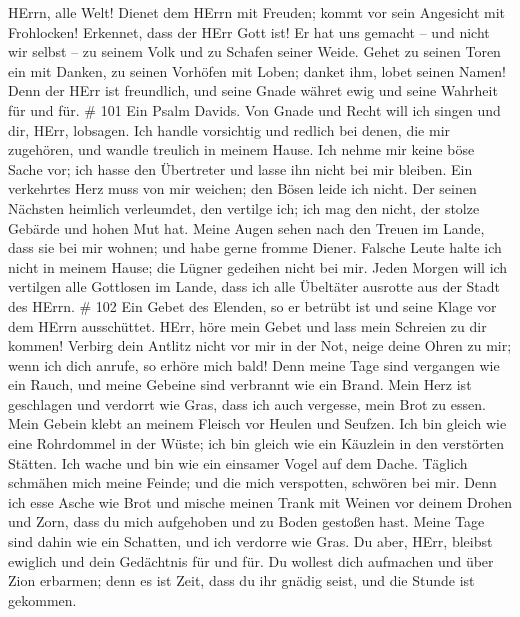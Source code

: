 HErrn, alle Welt!  Dienet dem HErrn mit Freuden; kommt vor
sein Angesicht mit Frohlocken!  Erkennet, dass der HErr Gott
ist! Er hat uns gemacht -- und nicht wir selbst -- zu seinem Volk und zu
Schafen seiner Weide.  Gehet zu seinen Toren ein mit Danken,
zu seinen Vorhöfen mit Loben; danket ihm, lobet seinen Namen!
 Denn der HErr ist freundlich, und seine Gnade währet ewig
und seine Wahrheit für und für. \# 101  Ein Psalm Davids.
Von Gnade und Recht will ich singen und dir, HErr, lobsagen.
 Ich handle vorsichtig und redlich bei denen, die mir
zugehören, und wandle treulich in meinem Hause.  Ich nehme
mir keine böse Sache vor; ich hasse den Übertreter und lasse ihn nicht
bei mir bleiben.  Ein verkehrtes Herz muss von mir weichen;
den Bösen leide ich nicht.  Der seinen Nächsten heimlich
verleumdet, den vertilge ich; ich mag den nicht, der stolze Gebärde und
hohen Mut hat.  Meine Augen sehen nach den Treuen im Lande,
dass sie bei mir wohnen; und habe gerne fromme Diener. 
Falsche Leute halte ich nicht in meinem Hause; die Lügner gedeihen nicht
bei mir.  Jeden Morgen will ich vertilgen alle Gottlosen im
Lande, dass ich alle Übeltäter ausrotte aus der Stadt des HErrn. \# 102
 Ein Gebet des Elenden, so er betrübt ist und seine Klage
vor dem HErrn ausschüttet.  HErr, höre mein Gebet und lass
mein Schreien zu dir kommen!  Verbirg dein Antlitz nicht vor
mir in der Not, neige deine Ohren zu mir; wenn ich dich anrufe, so
erhöre mich bald!  Denn meine Tage sind vergangen wie ein
Rauch, und meine Gebeine sind verbrannt wie ein Brand.  Mein
Herz ist geschlagen und verdorrt wie Gras, dass ich auch vergesse, mein
Brot zu essen.  Mein Gebein klebt an meinem Fleisch vor
Heulen und Seufzen.  Ich bin gleich wie eine Rohrdommel in
der Wüste; ich bin gleich wie ein Käuzlein in den verstörten Stätten.
 Ich wache und bin wie ein einsamer Vogel auf dem Dache.
 Täglich schmähen mich meine Feinde; und die mich
verspotten, schwören bei mir.  Denn ich esse Asche wie Brot
und mische meinen Trank mit Weinen  vor deinem Drohen und
Zorn, dass du mich aufgehoben und zu Boden gestoßen hast. 
Meine Tage sind dahin wie ein Schatten, und ich verdorre wie Gras.
 Du aber, HErr, bleibst ewiglich und dein Gedächtnis für
und für.  Du wollest dich aufmachen und über Zion erbarmen;
denn es ist Zeit, dass du ihr gnädig seist, und die Stunde ist gekommen.
